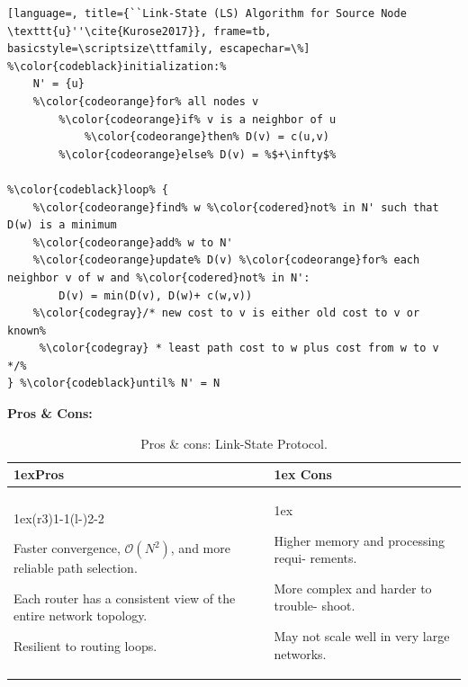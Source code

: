 \begin{lstlisting}[language=, title={``Link-State (LS) Algorithm for Source Node \texttt{u}''\cite{Kurose2017}}, frame=tb, basicstyle=\scriptsize\ttfamily, escapechar=\%]
%\color{codeblack}initialization:%
    N' = {u}
    %\color{codeorange}for% all nodes v
        %\color{codeorange}if% v is a neighbor of u
            %\color{codeorange}then% D(v) = c(u,v)
        %\color{codeorange}else% D(v) = %$+\infty$%

%\color{codeblack}loop% {
    %\color{codeorange}find% w %\color{codered}not% in N' such that D(w) is a minimum
    %\color{codeorange}add% w to N'
    %\color{codeorange}update% D(v) %\color{codeorange}for% each neighbor v of w and %\color{codered}not% in N':
        D(v) = min(D(v), D(w)+ c(w,v))
    %\color{codegray}/* new cost to v is either old cost to v or known%
     %\color{codegray} * least path cost to w plus cost from w to v */%
} %\color{codeblack}until% N' = N
\end{lstlisting}

\vspace{1em}
\noindent \textbf{Pros \& Cons:}
\begin{table}[H]
    \begin{tabularx}{\linewidth}{>{\parskip1ex}X@{\kern4\tabcolsep}>{\parskip1ex}X}
    \toprule
    \hfil\bfseries Pros
    &
    \hfil\bfseries Cons 
    \\\cmidrule(r{3\tabcolsep}){1-1}\cmidrule(l{-\tabcolsep}){2-2}
    
    Faster convergence, $\mathcal{O}(N^2)$, and more reliable path selection.\par
    Each router has a consistent view of the entire network topology.\par
    Resilient to routing loops.
    &
    
    Higher memory and processing requi- rements.\par
    More complex and harder to trouble- shoot.\par
    May not scale well in very large networks.
    \\\bottomrule
    \end{tabularx}
    \caption{Pros \& cons: Link-State Protocol.}
\end{table}

